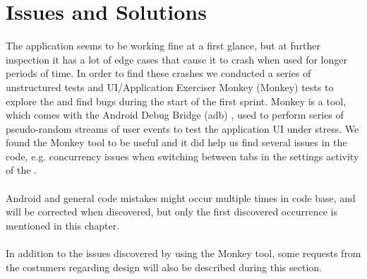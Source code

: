 
\chapter{Issues and Solutions}

The \launcher application seems to be working fine at a first glance, but at further inspection it has a lot of edge cases that cause it to crash when used for longer periods of time. In order to find these crashes we conducted a series of unstructured tests and UI/Application Exerciser Monkey (Monkey) \parencite{android_monkey} tests to explore the \launcher and find bugs during the start of the first sprint. Monkey is a tool, which comes with the Android Debug Bridge (adb) \parencite{android_adb}, used to perform series of pseudo-random streams of user events to test the application UI under stress. We found the Monkey tool to be useful and it did help us find several issues in the code, e.g. concurrency issues when switching between tabs in the settings activity of the \launcher.
\\\\
Android and general code mistakes might occur multiple times in code base, and will be corrected when discovered, but only the first discovered occurrence is mentioned in this chapter. 
\\\\
In addition to the issues discovered by using the Monkey tool, some requests from the costumers regarding design will also be described during this section.





















